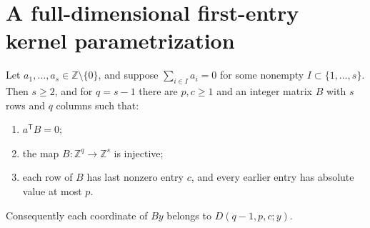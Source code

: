 \section{A full-dimensional first-entry kernel parametrization}

\begin{lemma}
\label{qr:kernel-matrix}
\leanok
Let $a_1,\ldots,a_s\in\mathbb Z\setminus\{0\}$, and suppose
$\sum_{i\in I}a_i=0$ for some nonempty $I\subset\{1,\ldots,s\}$.
Then $s\geq2$, and for $q=s-1$ there are $p,c\geq1$ and an integer
matrix $B$ with $s$ rows and $q$ columns such that:
\begin{enumerate}
\item $a^{\mathsf T}B=0$;
\item the map $B:\mathbb Z^q\to\mathbb Z^s$ is injective;
\item each row of $B$ has last nonzero entry $c$, and every earlier
      entry has absolute value at most $p$.
\end{enumerate}
Consequently each coordinate of $By$ belongs to $D(q-1,p,c;y)$.
\end{lemma}
